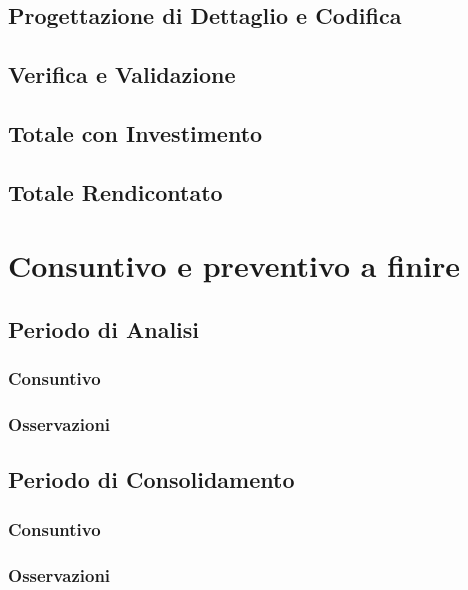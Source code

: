 \documentclass[a4paper, oneside, openany, dvipsnames, table]{article}
\begin{document}
	\subsection{Progettazione di Dettaglio e Codifica}
	    
	\newpage
	\subsection{Verifica e Validazione}
	    
	\newpage
	\subsection{Totale con Investimento}
	    
	\newpage
	\subsection{Totale Rendicontato}
	    	
\newpage
\section{Consuntivo e preventivo a finire}
	
	\newpage
	\subsection{Periodo di Analisi}
		
		\subsubsection{Consuntivo}
			
		\subsubsection{Osservazioni}
			
	\newpage
	\subsection{Periodo di Consolidamento}
			
		\subsubsection{Consuntivo}
			
		\subsubsection{Osservazioni}
			
	\newpage
\end{document}
